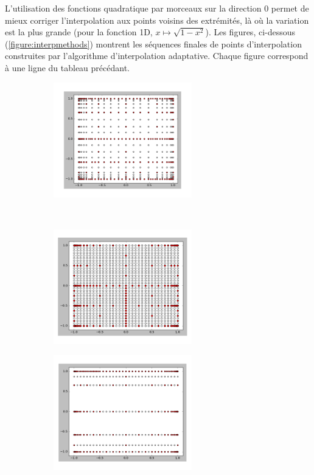 L'utilisation des fonctions quadratique par morceaux sur la direction $0$ permet de mieux corriger l'interpolation aux points voisins des extrémités, là où la variation est la plus grande (pour la fonction 1D, $x \mapsto \sqrt{1-x^2}$). Les figures, ci-dessous (\ref{figure:interpmethods}) montrent les séquences finales de points d'interpolation construites par l'algorithme d'interpolation adaptative. Chaque figure correspond à une ligne du tableau précédant.
\begin{center}
\begin{figure}[!h]
    \centering
    \begin{subfigure}[b]{0.45\textwidth}
				\includegraphics[width=\linewidth,height=5cm]{images/0.png}
    \end{subfigure}
		~
    \begin{subfigure}[b]{0.45\textwidth}
        \includegraphics[width=\linewidth,height=5cm]{images/2.png}
    \end{subfigure}
		\begin{subfigure}[b]{0.45\textwidth}
				\includegraphics[width=\linewidth,height=5cm]{images/mixed.png}
		\end{subfigure}
\end{figure}
\label{figure:interpmethods}
\end{center}

